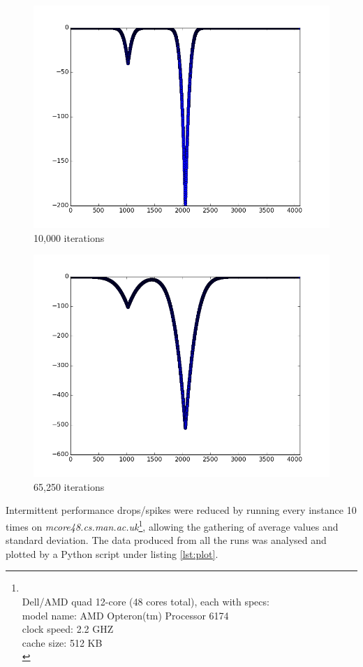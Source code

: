 \documentclass{article}
\begin{document}
\begin{figure}
\begin{minipage}{0.45\textwidth}
  \includegraphics[width=1\linewidth, natwidth=800, natheight=600]{graphs/it10000.png}\\
  10,000 iterations
\end{minipage}
\begin{minipage}{0.45\textwidth}
  \centering
  \includegraphics[width=1\linewidth, natwidth=800, natheight=600]{graphs/itFinal.png}\\
  65,250 iterations
\end{minipage}
\end{figure}	

Intermittent performance drops/spikes were reduced by running every instance 10 times on \textit{mcore48.cs.man.ac.uk}\footnote{\label{machinespecs} \\
  Dell/AMD quad 12-core (48 cores total), each with specs:\\
  model name: AMD Opteron(tm) Processor 6174 \\
  clock speed: 2.2 GHZ \\
  cache size: 512 KB \\}, allowing the gathering of average values and standard deviation. The data produced from all the runs was analysed and plotted by a Python script under listing \ref{lst:plot}.
\end{document}
